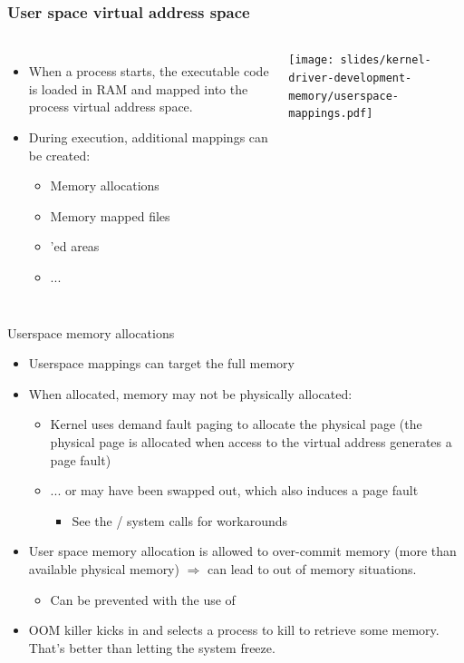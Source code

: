 \begin{frame}
  \frametitle{User space virtual address space}
  \begin{columns}
    \begin{itemize}
    \item When a process starts, the executable code is loaded in RAM and
      mapped into the process virtual address space.
    \item During execution, additional mappings can be created:
      \begin{itemize}
      \item Memory allocations
      \item Memory mapped files
      \item {}'ed areas
      \item ...
      \end{itemize}
    \end{itemize}
    \texttt{[image: slides/kernel-driver-development-memory/userspace-mappings.pdf]}
  \end{columns}
\end{frame}

\begin{frame}{Userspace memory allocations}
  \begin{itemize}
  \item Userspace mappings can target the full memory
  \item When allocated, memory may not be physically allocated:
    \begin{itemize}
    \item Kernel uses demand fault paging to allocate the physical
      page (the physical page is allocated when access to the virtual
      address generates a page fault)
    \item ... or may have been swapped out, which also induces a page
      fault
      \begin{itemize}
      \item See the / system calls for
        workarounds
      \end{itemize}
    \end{itemize}
  \item User space memory allocation is allowed to over-commit memory
    (more than available physical memory) $\Rightarrow$ can lead to
    out of memory situations.
    \begin{itemize}
    \item Can be prevented with the use of
    \end{itemize}
  \item OOM killer kicks in and selects a process to kill to retrieve
    some memory. That's better than letting the system freeze.
  \end{itemize}
\end{frame}

